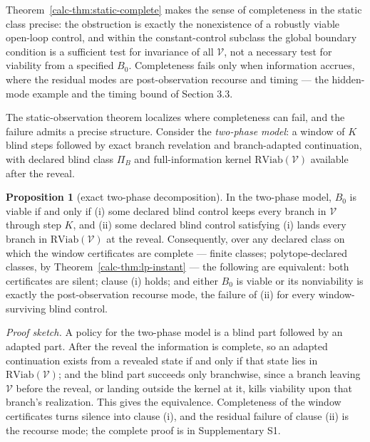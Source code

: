 \documentclass[10pt,twocolumn]{article}
\theoremstyle{definition}
\newtheorem{proposition}{Proposition}
\begin{document}
Theorem~\ref{calc-thm:static-complete} makes the sense of completeness in the static class precise: the obstruction is exactly the nonexistence of a robustly viable open-loop control, and within the constant-control subclass the global boundary condition is a sufficient test for invariance of all \(\mathcal V\), not a necessary test for viability from a specified \(B_0\). Completeness fails only when information accrues, where the residual modes are post-observation recourse and timing --- the hidden-mode example and the timing bound of Section 3.3.

\medskip
The static-observation theorem localizes where completeness can fail, and the failure
admits a precise structure. Consider the \emph{two-phase model}: a window of \(K\) blind
steps followed by exact branch revelation and branch-adapted continuation, with declared
blind class \(\Pi_{B}\) and full-information kernel \(\mathrm{RViab}(\mathcal{V})\)
available after the reveal.

\begin{proposition}[exact two-phase decomposition]\label{calc-prop:decomposition}
In the two-phase model, \(B_{0}\) is viable if and only if (i) some declared blind control
keeps every branch in \(\mathcal{V}\) through step \(K\), and (ii) some declared blind
control satisfying (i) lands every branch in \(\mathrm{RViab}(\mathcal{V})\) at the reveal.
Consequently, over any declared class on which the window certificates are complete ---
finite classes; polytope-declared classes, by Theorem~\ref{calc-thm:lp-instant} --- the following
are equivalent: both certificates are silent; clause (i) holds; and either \(B_{0}\) is
viable or its nonviability is exactly the post-observation recourse mode, the failure of
(ii) for every window-surviving blind control.
\end{proposition}

\emph{Proof sketch.} A policy for the two-phase model is a blind part followed by an
adapted part. After the reveal the information is complete, so an adapted continuation
exists from a revealed state if and only if that state lies in
\(\mathrm{RViab}(\mathcal{V})\); and the blind part succeeds only branchwise, since a branch
leaving \(\mathcal{V}\) before the reveal, or landing outside the kernel at it, kills
viability upon that branch's realization. This gives the equivalence. Completeness of the
window certificates turns silence into clause (i), and the residual failure of
clause (ii) is the recourse mode; the complete proof is in Supplementary S1.
\end{document}
